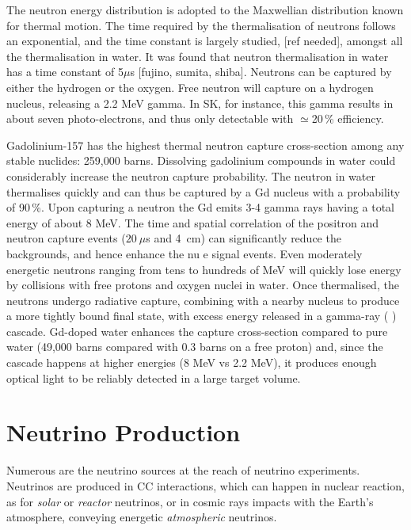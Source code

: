  The neutron energy distribution is adopted to the Maxwellian distribution known for thermal motion.
 The time required by the thermalisation of neutrons follows an exponential, and the time constant is largely %
 studied, [ref needed], amongst all the thermalisation in water.
 It was found that neutron thermalisation in water has a time constant of 5$\mu$s [fujino, sumita, shiba].
 Neutrons can be captured by either the hydrogen or the oxygen.
 Free neutron will capture on a hydrogen nucleus, releasing a 2.2 MeV gamma.
 In SK, for instance, this gamma results in about seven photo-electrons, and thus only detectable with $\simeq$20\,\% %
 efficiency.

 Gadolinium-157 has the highest thermal neutron capture cross-section among any stable %
 nuclides: 259,000 barns.
 Dissolving gadolinium compounds in water could considerably increase the neutron capture probability.
 The neutron in water thermalises quickly and can thus be captured by a Gd nucleus with a probability of 90\,\%.
 Upon capturing a neutron the Gd emits 3-4 gamma rays having a total energy of about 8 MeV.
 The time and spatial correlation of the positron and neutron capture events ($20~\mu$s and 4~cm) %
 can significantly reduce the backgrounds, and hence enhance the nu e signal events.
 Even moderately energetic neutrons ranging from tens to hundreds of MeV will quickly lose energy %
 by collisions with free protons and oxygen nuclei in water. 
 Once thermalised, the neutrons undergo radiative capture, combining with a nearby nucleus to %
 produce a more tightly bound final state, with excess energy released in a gamma-ray ( ) cascade. 
 Gd-doped water enhances the capture cross-section compared to pure water %
 (49,000 barns compared with 0.3 barns on a free proton) and, since the cascade happens %
 at higher energies (8 MeV vs 2.2 MeV), it produces enough optical light to be reliably detected in %
 a large target volume.


 \section{Neutrino Production}
 \label{sec:prod}

 Numerous are the neutrino sources at the reach of neutrino experiments.
 Neutrinos are produced in CC interactions, which can happen in nuclear reaction, as for \emph{solar} %
 or \emph{reactor} neutrinos, or in cosmic rays impacts with the Earth's atmosphere, %
 conveying energetic \emph{atmospheric} neutrinos.

